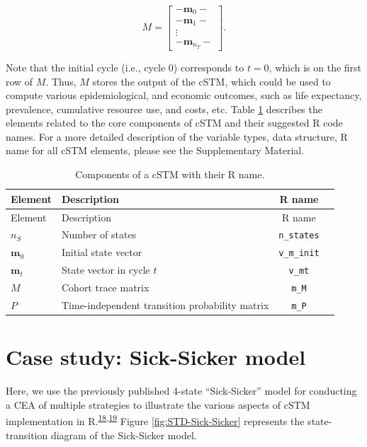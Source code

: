 \documentclass[
]{article}
\begin{document}
\[
  M = 
  \begin{bmatrix}
    - \mathbf{m}_0 -  \\
    - \mathbf{m}_1 -  \\
     \vdots \\
    - \mathbf{m}_{n_T} -  
  \end{bmatrix}. 
\]

Note that the initial cycle (i.e., cycle 0) corresponds to \(t=0\), which is on the first row of \(M\). Thus, \(M\) stores the output of the cSTM, which could be used to compute various epidemiological, and economic outcomes, such as life expectancy, prevalence, cumulative resource use, and costs, etc. Table \ref{tab:cSTM-components-table} describes the elements related to the core components of cSTM and their suggested R code names. For a more detailed description of the variable types, data structure, R name for all cSTM elements, please see the Supplementary Material.

\begin{longtable}[]{@{}llcl@{}}
\caption{\label{tab:cSTM-components-table} Components of a cSTM with their R name.}\tabularnewline
\toprule
Element & Description & R name & \\
\midrule
\endfirsthead
\toprule
Element & Description & R name & \\
\midrule
\endhead
\(n_S\) & Number of states & \texttt{n\_states} & \\
\(\mathbf{m}_0\) & Initial state vector & \texttt{v\_m\_init} & \\
\(\mathbf{m}_t\) & State vector in cycle \(t\) & \texttt{v\_mt} & \\
\(M\) & Cohort trace matrix & \texttt{m\_M} & \\
\(P\) & Time-independent transition probability matrix & \texttt{m\_P} & \\
\bottomrule
\end{longtable}

\hypertarget{case-study-sick-sicker-model}{%
\section{Case study: Sick-Sicker model}\label{case-study-sick-sicker-model}}

Here, we use the previously published 4-state ``Sick-Sicker'' model for conducting a CEA of multiple strategies to illustrate the various aspects of cSTM implementation in R.\textsuperscript{\protect\hyperlink{ref-Enns2015e}{18},\protect\hyperlink{ref-Krijkamp2018}{19}} Figure \ref{fig:STD-Sick-Sicker} represents the state-transition diagram of the Sick-Sicker model.
\end{document}
